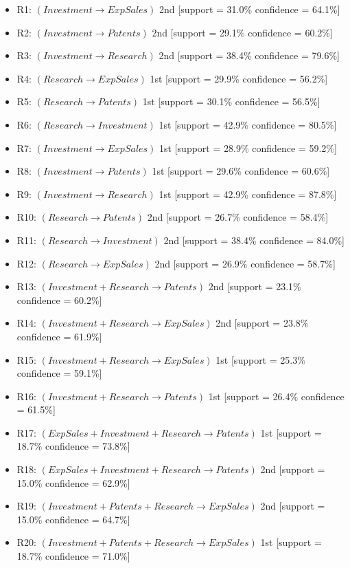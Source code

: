 \documentclass[a4paper,twoside]{article}
\begin{document}
\begin{itemize}
    \item R1: $( Investment \to ExpSales )$ 2nd [support = 31.0\% confidence = 64.1\%]
    \item R2: $( Investment \to Patents )$ 2nd [support = 29.1\% confidence = 60.2\%]
    \item R3: $( Investment \to Research )$ 2nd [support = 38.4\% confidence = 79.6\%]
    \item R4: $( Research \to ExpSales )$ 1st [support = 29.9\% confidence = 56.2\%]
    \item R5: $( Research \to Patents )$ 1st [support = 30.1\% confidence = 56.5\%]
    \item R6: $( Research \to Investment )$ 1st [support = 42.9\% confidence = 80.5\%]
    \item R7: $( Investment \to ExpSales )$ 1st [support = 28.9\% confidence = 59.2\%]
    \item R8: $( Investment \to Patents )$ 1st [support = 29.6\% confidence = 60.6\%]
    \item R9: $( Investment \to Research )$ 1st [support = 42.9\% confidence = 87.8\%]
    \item R10: $( Research \to Patents )$ 2nd [support = 26.7\% confidence = 58.4\%]
    \item R11: $( Research \to Investment )$ 2nd [support = 38.4\% confidence = 84.0\%]
    \item R12: $( Research \to ExpSales )$ 2nd [support = 26.9\% confidence = 58.7\%]
    \item R13: $( Investment+Research \to Patents )$ 2nd [support = 23.1\% confidence = 60.2\%]
    \item R14: $( Investment+Research \to ExpSales )$ 2nd [support = 23.8\% confidence = 61.9\%]
    \item R15: $( Investment+Research \to ExpSales )$ 1st [support = 25.3\% confidence = 59.1\%]
    \item R16: $( Investment+Research \to Patents )$ 1st [support = 26.4\% confidence = 61.5\%]
    \item R17: $( ExpSales+Investment+Research \to Patents )$ 1st [support = 18.7\% confidence = 73.8\%]
    \item R18: $( ExpSales+Investment+Research \to Patents )$ 2nd [support = 15.0\% confidence = 62.9\%]
    \item R19: $( Investment+Patents+Research \to ExpSales )$ 2nd [support = 15.0\% confidence = 64.7\%]
    \item R20: $( Investment+Patents+Research \to ExpSales )$ 1st [support = 18.7\% confidence = 71.0\%]
\end{itemize}
\end{document}
